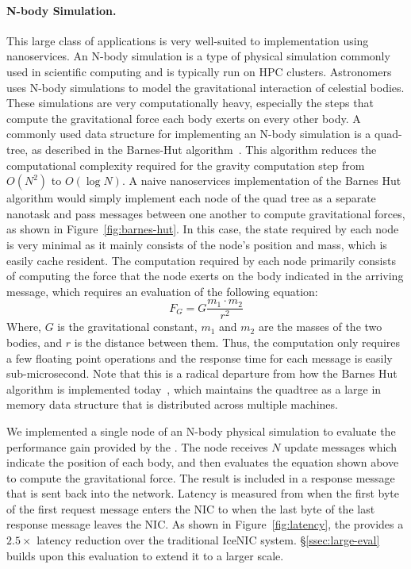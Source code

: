 \paragraph{N-body Simulation.} This large class of applications is very well-suited to implementation using nanoservices.
An N-body simulation is a type of physical simulation commonly used in scientific computing and is typically run on HPC clusters.
Astronomers uses N-body simulations to model the gravitational interaction of celestial bodies.
These simulations are very computationally heavy, especially the steps that compute the gravitational force each body exerts on every other body.
A commonly used data structure for implementing an N-body simulation is a quad-tree, as described in the Barnes-Hut algorithm~\cite{barnes-hut}.
This algorithm reduces the computational complexity required for the gravity computation step from $O(N^2)$ to $O(\log N)$.
A naive nanoservices implementation of the Barnes Hut algorithm would simply implement each node of the quad tree as a separate nanotask and pass messages between one another to compute gravitational forces, as shown in Figure~\ref{fig:barnes-hut}.
In this case, the state required by each node is very minimal as it mainly consists of the node's position and mass, which is easily cache resident.
The computation required by each node primarily consists of computing the force that the node exerts on the body indicated in the arriving message, which requires an evaluation of the following equation:
$$ F_G = G\frac{m_1 \cdot m_2}{r^2} $$
Where, $G$ is the gravitational constant, $m_1$ and $m_2$ are the masses of the two bodies, and $r$ is the distance between them.
Thus, the computation only requires a few floating point operations and the response time for each message is easily sub-microsecond.
Note that this is a radical departure from how the Barnes Hut algorithm is implemented today~\cite{changa}, which maintains the quadtree as a large in memory data structure that is distributed across multiple machines.

We implemented a single node of an N-body physical simulation to evaluate the performance gain provided by the \name{}.
The node receives $N$ update messages which indicate the position of each body, and then evaluates the equation shown above to compute the gravitational force.
The result is included in a response message that is sent back into the network.
Latency is measured from when the first byte of the first request message enters the NIC to when the last byte of the last response message leaves the NIC.
As shown in Figure~\ref{fig:latency}, the \name{} provides a $2.5\times$ latency reduction over the traditional IceNIC system.
\S\ref{ssec:large-eval} builds upon this evaluation to extend it to a larger scale. 


